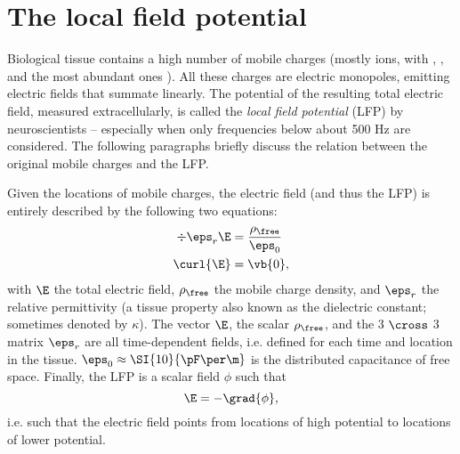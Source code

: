 \section{The local field potential}
\label{sec:LFP}

Biological tissue contains a high number of mobile charges (mostly ions, with , , and  the most abundant ones \cite{Martinsen2015a}). All these charges are electric monopoles, emitting electric fields that summate linearly. The potential of the resulting total electric field, measured extracellularly, is called the \emph{local field potential} (LFP) by neuroscientists -- especially when only frequencies below about 500 Hz are considered. The following paragraphs briefly discuss the relation between the original mobile charges and the LFP.

Given the locations of mobile charges, the electric field (and thus the LFP) is entirely described by the following two equations:\footnotemark{}
%
\begin{align}
\div{\eps_r \E}  &= \frac{\rho_\free}{\eps_0}   \label{eq:gauss} \\
\curl{\E}        &= \vb{0},                     \label{eq:irrot}
\end{align}
%
with $\E$ the total electric field, $\rho_\free$ the mobile charge density, and $\eps_r$ the relative permittivity (a tissue property also known as the dielectric constant; sometimes denoted by $\kappa$). The vector $\E$, the scalar $\rho_\free$, and the 3 $\cross$ 3 matrix $\eps_r$ are all time-dependent fields, i.e. defined for each time and location in the tissue. $\eps_0 \approx \SI{10}{\pF\per\m}$ is the distributed capacitance of free space. Finally, the LFP is a scalar field $\phi$ such that
%
\begin{equation}
\label{eq:potential}
\E = -\grad{\phi},
\end{equation}
%
i.e. such that the electric field points from locations of high potential to locations of lower potential.


